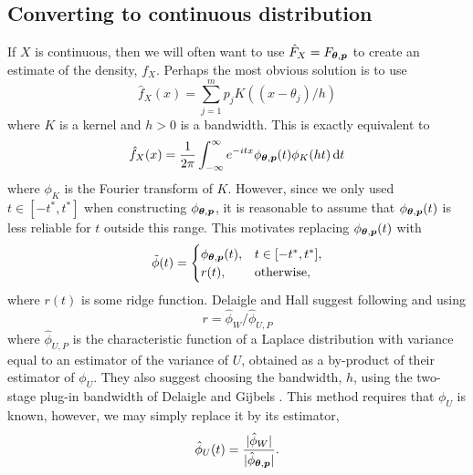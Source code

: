 	\subsection{Converting to continuous distribution}

	If $X$ is continuous, then we will often want to use $\hat{F}_X = F_{{\bm{{\theta}}}, {\bm{{p}}}}$ to create an estimate of the density, $f_X$. Perhaps the most obvious solution is to use
	\begin{equation}
		\hat{f}_X(x) = \sum_{j=1}^m p_j K((x - \theta_j)/h)
	\end{equation}
	where $K$ is a kernel and $h > 0$ is a bandwidth. This is exactly equivalent to 
	\begin{equation}
		\hat{f}_X(x) = \frac{1}{2\pi}\int_{-\infty}^{\infty} e^{-itx} \phi_{{\bm{{\theta}}}, {\bm{{p}}}}(t) \phi_K(ht) \, \mathrm{d} t
	\end{equation}
	where $\phi_K$ is the Fourier transform of $K$. However, since we only used $t \in [-t^*, t^*]$ when constructing $\phi_{{\bm{{\theta}}}, {\bm{{p}}}}$, it is reasonable to assume that $\phi_{{\bm{{\theta}}}, {\bm{{p}}}}(t)$ is less reliable for $t$ outside this range. This motivates replacing $\phi_{{\bm{{\theta}}}, {\bm{{p}}}}(t)$ with
	\begin{equation}
		\tilde{\phi}(t) = 
		\begin{cases}
			\phi_{{\bm{{\theta}}}, {\bm{{p}}}}(t), & t \in [-t^*, t^*],\\
			r(t), & \text{otherwise},
		\end{cases}
	\end{equation}
	where $r(t)$ is some ridge function. Delaigle and Hall \cite{Delaigle2016-la} suggest following \cite{Delaigle2008-hl} and using
	\begin{equation}
		r = \hat{\phi}_W / \hat{\phi}_{U,P}
	\end{equation}
	where $\hat{\phi}_{U,P}$ is the characteristic function of a Laplace distribution with variance equal to an estimator of the variance of $U$, obtained as a by-product of their estimator of $\phi_U$. They also suggest choosing the bandwidth, $h$, using the two-stage plug-in bandwidth of Delaigle and Gijbels \cite{Delaigle2002-pa} \cite{Delaigle2004-fy}. This method requires that $\phi_U$ is known, however, we may simply replace it by its estimator,
	\begin{equation}
		\hat{\phi}_U(t) = \frac{|\hat{\phi}_W|}{|\hat{\phi}_{{\bm{{\theta}}},{\bm{{p}}}}|}.
	\end{equation}


